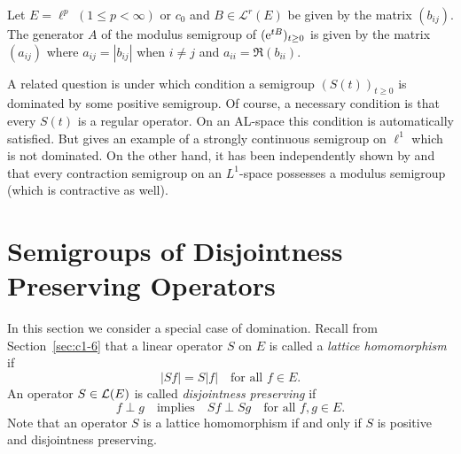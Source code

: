 \begin{example}\label{ex:c2-4.19}
Let $E = \ell^{p}$ $(1 \leq p < \infty)$ or $c_{0}$ and $B \in \mathcal{L}^{r}(E)$ be
given by the matrix $(b_{ij})$.
The generator $A$ of the modulus semigroup of\/ $(\eu^{tB})_{t \geq 0}$ is given by the matrix $(a_{ij})$ where $a_{ij} = |b_{ij}|$ when $i \neq j$ and $a_{ii} = \Re(b_{ii})$.
\end{example}
A related question is under which condition a semigroup $(S(t))_{t \geq 0}$ is
dominated by some positive semigroup.
Of course, a necessary condition is that every $S(t)$ is a regular operator.
On an AL-space this condition is automatically satisfied.
But \textcite{kipnis:1974} gives an example of a strongly continuous semigroup on $\ell^{1}$ which is not dominated.
On the other hand, it has been independently shown by \textcite{kipnis:1974} and
\textcite{kubokawa:1975} that every contraction semigroup on an $L^{1}$-space
possesses a modulus semigroup (which is contractive as well).
\section{Semigroups of Disjointness Preserving Operators} \label{sec:c2-5}%
In this section we consider a special case of domination. 
Recall from Section~\ref{sec:c1-6} 
that a linear operator $S$ on $E$ is called a \emph{lattice homomorphism} if
\begin{equation}\label{eq:c2-5.1}
|Sf| = S|f| \quad \text{for all } f \in E.
\end{equation}
An operator $S \in \mathcal{L}(E)$ is called \emph{disjointness preserving} if
\begin{equation}\label{eq:c2-5.2}
f \perp g \quad \text{implies} \quad Sf \perp Sg \quad \text{for all } f,g \in E.
\end{equation}
Note that an operator $S$ is a lattice homomorphism if and only if\/ $S$
is positive and disjointness preserving.


